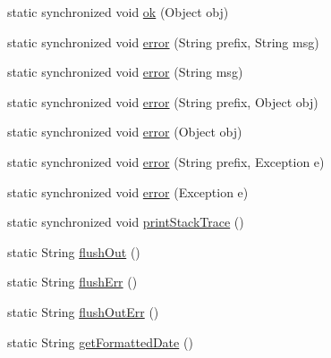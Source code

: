 \begin{DoxyCompactItemize}
\item 
static synchronized void \hyperlink{classit_1_1emarolab_1_1cagg_1_1debugging_1_1StandaloneDebuggingText_1_1Logger_ad6f6877789496c50aaff9ecad29c6083}{ok} (Object obj)
\item 
static synchronized void \hyperlink{classit_1_1emarolab_1_1cagg_1_1debugging_1_1StandaloneDebuggingText_1_1Logger_aabde8c13d41a901d16cc5d6fe5fda188}{error} (String prefix, String msg)
\item 
static synchronized void \hyperlink{classit_1_1emarolab_1_1cagg_1_1debugging_1_1StandaloneDebuggingText_1_1Logger_a203e2665df36e64f58ba0bbda346b22f}{error} (String msg)
\item 
static synchronized void \hyperlink{classit_1_1emarolab_1_1cagg_1_1debugging_1_1StandaloneDebuggingText_1_1Logger_af2fe73b45455e2afce1b6af43d6e7216}{error} (String prefix, Object obj)
\item 
static synchronized void \hyperlink{classit_1_1emarolab_1_1cagg_1_1debugging_1_1StandaloneDebuggingText_1_1Logger_a5fd0c492eb4074f6151829de12f99f77}{error} (Object obj)
\item 
static synchronized void \hyperlink{classit_1_1emarolab_1_1cagg_1_1debugging_1_1StandaloneDebuggingText_1_1Logger_a55bf560286cdf68a485422490f2d4fba}{error} (String prefix, Exception e)
\item 
static synchronized void \hyperlink{classit_1_1emarolab_1_1cagg_1_1debugging_1_1StandaloneDebuggingText_1_1Logger_a94bfbb5227ed3efd446912afc8e17134}{error} (Exception e)
\item 
static synchronized void \hyperlink{classit_1_1emarolab_1_1cagg_1_1debugging_1_1StandaloneDebuggingText_1_1Logger_ad9b9f1a5b56fea189b747a6adf418dba}{print\-Stack\-Trace} ()
\item 
static String \hyperlink{classit_1_1emarolab_1_1cagg_1_1debugging_1_1StandaloneDebuggingText_1_1Logger_a183a06eb65bc84345773a5f75c977021}{flush\-Out} ()
\item 
static String \hyperlink{classit_1_1emarolab_1_1cagg_1_1debugging_1_1StandaloneDebuggingText_1_1Logger_aaa508dcaa92c2b63e0e6ac31bc23ddff}{flush\-Err} ()
\item 
static String \hyperlink{classit_1_1emarolab_1_1cagg_1_1debugging_1_1StandaloneDebuggingText_1_1Logger_a3834949691767f27ea4913df27751b10}{flush\-Out\-Err} ()
\item 
static String \hyperlink{classit_1_1emarolab_1_1cagg_1_1debugging_1_1StandaloneDebuggingText_1_1Logger_ab3b2d29c4145f20b75b09c4b0a934e3e}{get\-Formatted\-Date} ()
\item 

\end{DoxyCompactItemize}
